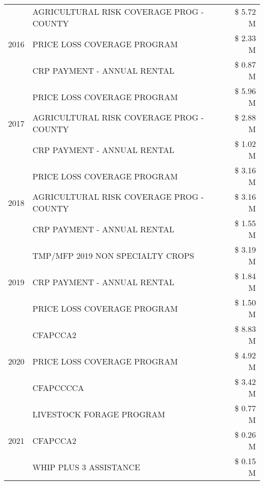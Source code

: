 \begin{tabular}{llr}
\cline{1-3}
\multirow[t]{3}{*}{2016} & AGRICULTURAL RISK COVERAGE PROG - COUNTY & \$ 5.72 M \\
 & PRICE LOSS COVERAGE PROGRAM & \$ 2.33 M \\
 & CRP PAYMENT - ANNUAL RENTAL & \$ 0.87 M \\
\cline{1-3}
\multirow[t]{3}{*}{2017} & PRICE LOSS COVERAGE PROGRAM & \$ 5.96 M \\
 & AGRICULTURAL RISK COVERAGE PROG - COUNTY & \$ 2.88 M \\
 & CRP PAYMENT - ANNUAL RENTAL & \$ 1.02 M \\
\cline{1-3}
\multirow[t]{3}{*}{2018} & PRICE LOSS COVERAGE PROGRAM & \$ 3.16 M \\
 & AGRICULTURAL RISK COVERAGE PROG - COUNTY & \$ 3.16 M \\
 & CRP PAYMENT - ANNUAL RENTAL & \$ 1.55 M \\
\cline{1-3}
\multirow[t]{3}{*}{2019} & TMP/MFP 2019 NON SPECIALTY CROPS & \$ 3.19 M \\
 & CRP PAYMENT - ANNUAL RENTAL & \$ 1.84 M \\
 & PRICE LOSS COVERAGE PROGRAM & \$ 1.50 M \\
\cline{1-3}
\multirow[t]{3}{*}{2020} & CFAPCCA2 & \$ 8.83 M \\
 & PRICE LOSS COVERAGE PROGRAM & \$ 4.92 M \\
 & CFAPCCCCA & \$ 3.42 M \\
\cline{1-3}
\multirow[t]{3}{*}{2021} & LIVESTOCK FORAGE PROGRAM & \$ 0.77 M \\
 & CFAPCCA2 & \$ 0.26 M \\
 & WHIP PLUS 3 ASSISTANCE & \$ 0.15 M \\
\cline{1-3}
\bottomrule
\end{tabular}
